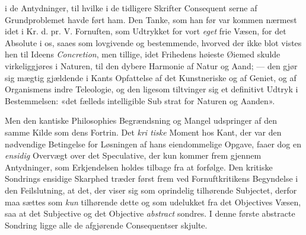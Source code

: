 \documentclass[12pt,a4paper]{book}
\begin{document}
i de Antydninger, til hvilke i de tidligere Skrifter Consequent\-%
serne af Grundproblemet havde ført ham. Den Tanke, som
han før var kommen nærmest idet i Kr. d. pr. V. Fornuften, som
Udtrykket for vort \emph{eget} frie Væsen, for det Absolute i os,
saaes som lovgivende og bestemmende, hvorved der ikke blot
vistes hen til Ideens \emph{Concretion}, men tillige, idet Frihedens
høieste Øiemed skulde virkeliggjøres i Naturen, til den dybere
Harmonie af Natur og Aand; --- den gjør sig mægtig gjældende
i Kants Opfattelse af det Kunstneriske og af Geniet, og af
Organismens indre Teleologie, og den ligesom tiltvinger sig et
definitivt Udtryk i Bestemmelsen: «det fælleds intelligible Sub\-%
strat for Naturen og Aanden».

Men den kantiske Philosophies Begrændsning og Mangel
udspringer af den samme Kilde som dens Fortrin. Det \emph{kri\-%
tiske} Moment hos Kant, der var den nødvendige Betingelse
for Løsningen af hans eiendommelige Opgave, faaer dog en
\emph{ensidig} Overvægt over det Speculative, der kun kommer frem
gjennem Antydninger, som Erkjendelsen holdes tilbage fra at
forfølge. Den kritiske Sondrings ensidige Skarphed træder
først frem ved Fornuftkritikens Begyndelse i den Feilslutning,
at det, der viser sig som oprindelig tilhørende Subjectet, derfor
maa sættes som \emph{kun} tilhørende dette og som udelukket fra
det Objectives Væsen, saa at det Subjective og det Objective
\emph{abstract} sondres. I denne første abstracte Sondring ligge
alle de afgjørende Consequentser skjulte.
\end{document}
